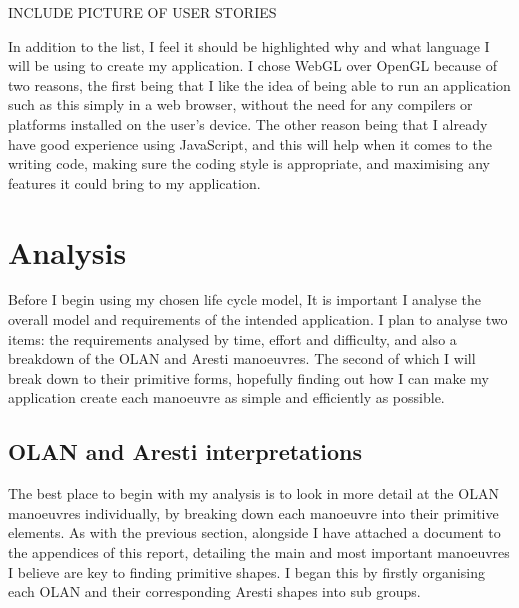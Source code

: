 INCLUDE PICTURE OF USER STORIES

In addition to the list, I feel it should be highlighted why and what language I will be using to create my application. I chose WebGL over OpenGL because of two reasons, the first being that I like the idea of being able to run an application such as this simply in a web browser, without the need for any compilers or platforms installed on the user's device. The other reason being that I already have good experience using JavaScript, and this will help when it comes to the writing code, making sure the coding style is appropriate, and maximising any features it could bring to my application.

\section{Analysis}
Before I begin using my chosen life cycle model, It is important I analyse the overall model and requirements of the intended application. I plan to analyse two items: the requirements analysed by time, effort and difficulty, and also a breakdown of the OLAN and Aresti manoeuvres. The second of which I will break down to their primitive forms, hopefully finding out how I can make my application create each manoeuvre as simple and efficiently as possible.

\subsection{OLAN and Aresti interpretations}
The best place to begin with my analysis is to look in more detail at the OLAN manoeuvres individually, by breaking down each manoeuvre into their primitive elements. As with the previous section, alongside I have attached a document to the appendices of this report, detailing the main and most important manoeuvres I believe are key to finding primitive shapes. I began this by firstly organising each OLAN and their corresponding Aresti shapes into sub groups. 

